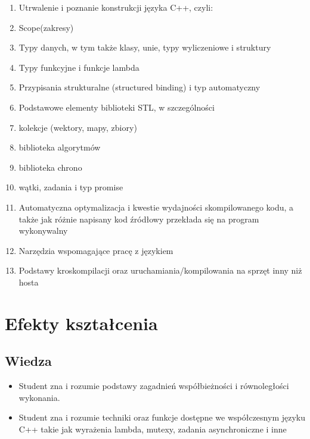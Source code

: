 \documentclass[12pt, a4paper]{article}
\begin{document}
\begin{enumerate}
  \item Utrwalenie i poznanie konstrukcji języka C++, czyli:
  \item Scope(zakresy)
  \item Typy danych, w tym także klasy, unie, typy wyliczeniowe i struktury
  \item Typy funkcyjne i funkcje lambda
  \item Przypisania strukturalne (structured binding) i typ automatyczny
  \item Podstawowe elementy biblioteki STL, w szczególności
  \item kolekcje (wektory, mapy, zbiory)
  \item biblioteka algorytmów
  \item biblioteka chrono
  \item wątki, zadania i typ promise
  \item Automatyczna optymalizacja i kwestie wydajności skompilowanego kodu, a także jak różnie napisany kod źródłowy przekłada się na program wykonywalny
  \item Narzędzia wspomagające pracę z językiem
  \item Podstawy kroskompilacji oraz uruchamiania/kompilowania na sprzęt inny niż hosta
\end{enumerate}

\section{Efekty kształcenia}

\subsection*{Wiedza}
\begin{itemize}
  \item Student zna i rozumie podstawy zagadnień współbieżności i równoległości wykonania.
  \item Student zna i rozumie techniki oraz funkcje dostępne we współczesnym języku C++ takie jak wyrażenia lambda, mutexy, zadania asynchroniczne i inne
\end{itemize}
\end{document}
